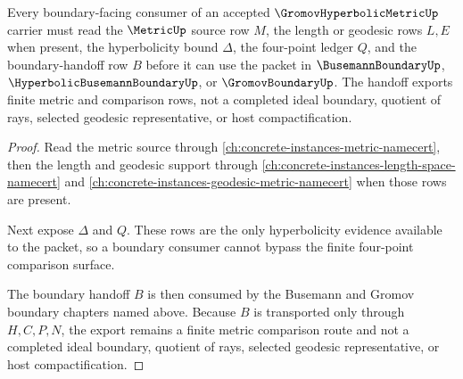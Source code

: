 \begin{theorem}
\label{thm:gromov-hyperbolic-metric-geodesic-boundary-route}
Every boundary-facing consumer of an accepted $\GromovHyperbolicMetricUp$ carrier must read the $\MetricUp$ source row $M$, the length or geodesic rows $L,E$ when present, the hyperbolicity bound $\Delta$, the four-point ledger $Q$, and the boundary-handoff row $B$ before it can use the packet in $\BusemannBoundaryUp$, $\HyperbolicBusemannBoundaryUp$, or $\GromovBoundaryUp$. The handoff exports finite metric and comparison rows, not a completed ideal boundary, quotient of rays, selected geodesic representative, or host compactification.
\end{theorem}
\begin{proof}
Read the metric source through \autoref{ch:concrete-instances-metric-namecert}, then the length and geodesic support through \autoref{ch:concrete-instances-length-space-namecert} and \autoref{ch:concrete-instances-geodesic-metric-namecert} when those rows are present.

Next expose $\Delta$ and $Q$. These rows are the only hyperbolicity evidence available to the packet, so a boundary consumer cannot bypass the finite four-point comparison surface.

The boundary handoff $B$ is then consumed by the Busemann and Gromov boundary chapters named above. Because $B$ is transported only through $H,C,P,N$, the export remains a finite metric comparison route and not a completed ideal boundary, quotient of rays, selected geodesic representative, or host compactification.
\end{proof}


\begin{closurestatus}{\GromovHyperbolicMetricUp}
  \theoryclosure{\seedClosure}
  \formalstatus{\unformalizedV}
\end{closurestatus}
